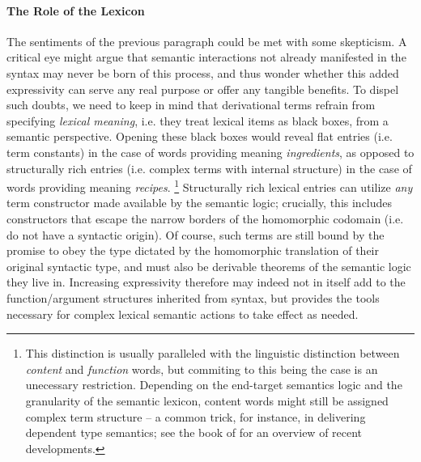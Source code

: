 \paragraph{The Role of the Lexicon}
The sentiments of the previous paragraph could be met with some skepticism.
A critical eye might argue that semantic interactions not already manifested in the syntax may never be born of this process, and thus wonder whether this added expressivity can serve any real purpose or offer any tangible benefits.
To dispel such doubts, we need to keep in mind that derivational terms refrain from specifying \textit{lexical meaning}, i.e. they treat lexical items as black boxes, from a semantic perspective.
Opening these black boxes would reveal flat entries (i.e. term constants) in the case of words providing meaning \textit{ingredients}, as opposed to structurally rich entries (i.e. complex terms with internal structure) in the case of words providing meaning \textit{recipes}.%
\footnote{This distinction is usually paralleled with the linguistic distinction between \textit{content} and \textit{function} words, but commiting to this being the case is an unecessary restriction. Depending on the end-target semantics logic and the granularity of the semantic lexicon, content words might still be assigned complex term structure -- a common trick, for instance, in delivering dependent type semantics; see the book of \citet{chatzikyriakidis2020formal} for an overview of recent developments.}
Structurally rich lexical entries can utilize \textit{any} term constructor made available by the semantic logic; crucially, this includes constructors that escape the narrow borders of the homomorphic codomain (i.e. do not have a syntactic origin).
Of course, such terms are still bound by the promise to obey the type dictated by the homomorphic translation of their original syntactic type, and must also be derivable theorems of the semantic logic they live in.
Increasing expressivity therefore may indeed not in itself add to the function/argument structures inherited from syntax, but provides the tools necessary for complex lexical semantic actions to take effect as needed.

